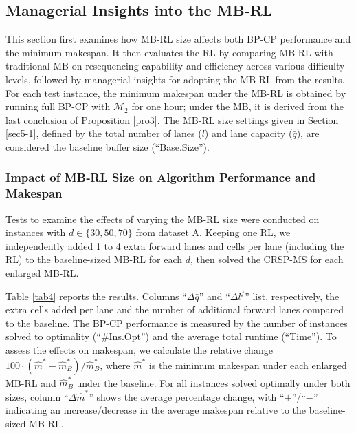 \documentclass[12pt]{article}
\begin{document}
\subsection{Managerial Insights into the MB-RL}\label{sec5-3}
This section first examines how MB-RL size affects both BP-CP performance and the minimum makespan. It then evaluates the RL by comparing MB-RL with traditional MB on resequencing capability and efficiency across various difficulty levels, followed by managerial insights for adopting the MB-RL from the results. For each test instance, the minimum makespan under the MB-RL is obtained by running full BP-CP with $\mathcal{M}_2$ for one hour; under the MB, it is derived from the last conclusion of Proposition \ref{pro3}. The MB-RL size settings given in Section \ref{sec5-1}, defined by the total number of lanes ($\bar{l}$) and lane capacity ($\bar{q}$), are considered the baseline buffer size (``Base.Size'').


\subsubsection*{Impact of MB‑RL Size on Algorithm Performance and Makespan}
Tests to examine the effects of varying the MB-RL size were conducted on instances with $d\in \{30, 50, 70\}$ from dataset A. Keeping one RL, we independently added 1 to 4 extra forward lanes and cells per lane (including the RL) to the baseline-sized MB-RL for each $d$, then solved the CRSP-MS for each enlarged MB-RL.

Table \ref{tab4} reports the results. Columns ``$\Delta\bar{q}$'' and ``$\Delta l^f$'' list, respectively, the extra cells added per lane and the number of additional forward lanes compared to the baseline. The BP-CP performance is measured by the number of instances solved to optimality (``\#Ins.Opt'') and the average total runtime (``Time''). To assess the effects on makespan, we calculate the relative change $100\cdot (\widehat{m}^* - \widehat{m}^*_B)/\widehat{m}^*_B$, where $\widehat{m}^*$ is the minimum makespan under each enlarged MB-RL and $\widehat{m}^*_B$ under the baseline. For all instances solved optimally under both sizes, column ``$\Delta \widehat{m}^*$'' shows the average percentage change, with ``$+$''/``$-$'' indicating an increase/decrease in the average makespan relative to the baseline-sized MB-RL.
\end{document}
